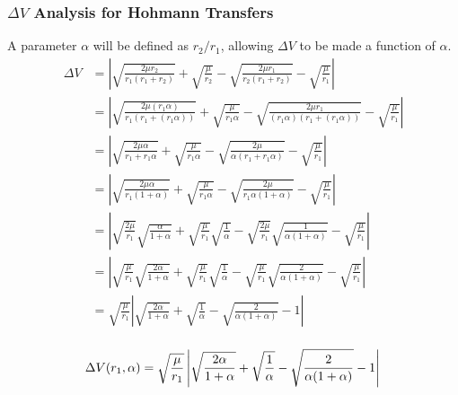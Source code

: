 \documentclass{article}
\begin{document}
\subsubsection{\texorpdfstring{$\Delta V$}{DeltaV} Analysis for Hohmann Transfers}

A parameter $\alpha$ will be defined as $r_2/r_1$, allowing $\Delta V$ to be made a function of $\alpha$.
\begin{align*}
    \Delta V & = \left|\sqrt{\frac{2\mu{}r_2}{r_1(r_1+r_2)}}+\sqrt{\frac{\mu}{r_2}}-\sqrt{\frac{2\mu{}r_1}{r_2(r_1+r_2)}}-\sqrt{\frac{\mu}{r_1}}\right|                                                           \\
             & = \left|\sqrt{\frac{2\mu{}(r_1\alpha)}{r_1(r_1+(r_1\alpha))}}+\sqrt{\frac{\mu}{r_1\alpha}}-\sqrt{\frac{2\mu{}r_1}{(r_1\alpha)(r_1+(r_1\alpha))}}-\sqrt{\frac{\mu}{r_1}}\right|                     \\
             & = \left|\sqrt{\frac{2\mu\alpha}{r_1+r_1\alpha}}+\sqrt{\frac{\mu}{r_1\alpha}}-\sqrt{\frac{2\mu}{\alpha(r_1+r_1\alpha)}}-\sqrt{\frac{\mu}{r_1}}\right|                                               \\
             & = \left|\sqrt{\frac{2\mu\alpha}{r_1(1+\alpha)}}+\sqrt{\frac{\mu}{r_1\alpha}}-\sqrt{\frac{2\mu}{r_1\alpha(1+\alpha)}}-\sqrt{\frac{\mu}{r_1}}\right|                                                 \\
             & = \left|\sqrt{\frac{2\mu}{r_1}}\sqrt{\frac{\alpha}{1+\alpha}}+\sqrt{\frac{\mu}{r_1}}\sqrt{\frac{1}{\alpha}}-\sqrt{\frac{2\mu}{r_1}}\sqrt{\frac{1}{\alpha(1+\alpha)}}-\sqrt{\frac{\mu}{r_1}}\right| \\
             & = \left|\sqrt{\frac{\mu}{r_1}}\sqrt{\frac{2\alpha}{1+\alpha}}+\sqrt{\frac{\mu}{r_1}}\sqrt{\frac{1}{\alpha}}-\sqrt{\frac{\mu}{r_1}}\sqrt{\frac{2}{\alpha(1+\alpha)}}-\sqrt{\frac{\mu}{r_1}}\right|  \\
             & = \sqrt{\frac{\mu}{r_1}}\left|\sqrt{\frac{2\alpha}{1+\alpha}}+\sqrt{\frac{1}{\alpha}}-\sqrt{\frac{2}{\alpha(1+\alpha)}}-1\right|                                                                   \\
\end{align*}

\begin{equation}\label{Delta V in terms of Alpha Hohmann}
    \Delta V(r_1,\alpha) = \sqrt{\frac{\mu}{r_1}}\left|\sqrt{\frac{2\alpha}{1+\alpha}}+\sqrt{\frac{1}{\alpha}}-\sqrt{\frac{2}{\alpha(1+\alpha)}}-1\right|\\
\end{equation}
\end{document}
